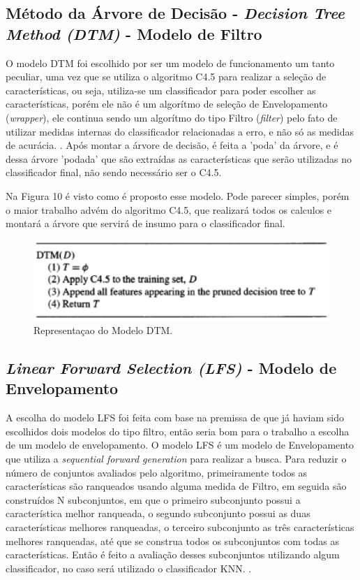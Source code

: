 \subsection{Método da Árvore de Decisão - \textit{Decision Tree Method (DTM)} - Modelo de Filtro}

O modelo DTM foi escolhido por ser um modelo de funcionamento um tanto peculiar, uma vez que se utiliza o algoritmo C4.5 para realizar a seleção de características, ou seja, utiliza-se um classificador para poder escolher as características, porém ele não é um algorítmo de seleção de Envelopamento (\textit{wrapper}), ele continua sendo um algorítmo do tipo Filtro (\textit{filter}) pelo fato de utilizar medidas internas do classificador relacionadas a erro, e não só as medidas de acurácia. \cite{dash_1997}. Após montar a árvore de decisão, é feita a 'poda' da árvore, e é dessa árvore 'podada' que são extraídas as características que serão utilizadas no classificador final, não sendo necessário ser o C4.5. 

Na Figura 10 é visto como é proposto esse modelo. Pode parecer simples, porém o maior trabalho advém do algoritmo C4.5, que realizará todos os calculos e montará a árvore que servirá de insumo para o classificador final.

\begin{figure}[h]
	\centering
	\label{fig12}
		\includegraphics[keepaspectratio=true,scale=0.7]{figuras/fig12.eps}
	\caption{Representaçao do Modelo DTM. \cite{dash_1997}}
\end{figure}

\subsection{\textit{Linear Forward Selection (LFS)} - Modelo de Envelopamento}

A escolha do modelo LFS foi feita com base na premissa de que já haviam sido escolhidos dois modelos do tipo filtro, então seria bom para o trabalho a escolha de um modelo de envelopamento. O modelo LFS é um modelo de Envelopamento que utiliza a \textit{sequential forward generation} para realizar a busca. Para reduzir o número de conjuntos avaliados pelo algoritmo, primeiramente todos as características são ranqueados usando alguma medida de Filtro, em seguida são construídos N subconjuntos, em que o primeiro subconjunto possui a característica melhor ranqueada, o segundo subconjunto possui as duas características melhores ranqueadas, o terceiro subconjunto as três características melhores ranqueadas, até que se construa todos os subconjuntos com todas as características. Então é feito a avaliação desses subconjuntos utilizando algum classificador, no caso será utilizado o classificador KNN. \cite{gutlein_2009}.

